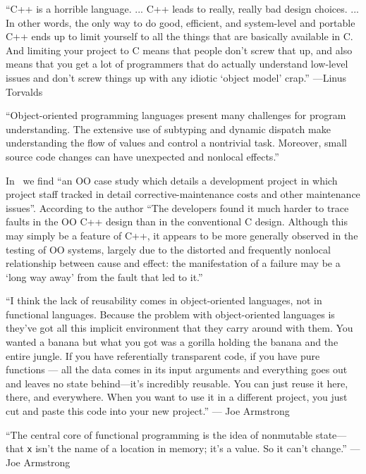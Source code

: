 \documentclass{article}
\begin{document}
\enquote{C++ is a horrible language. ... C++ leads to really, really bad
design choices. ... In other words, the only way to do good, efficient, and
system-level and portable C++ ends up to limit yourself to all the things
that are basically available in C. And limiting your project to C means that
people don't screw that up, and also means that you get a lot of programmers
that do actually understand low-level issues and don't screw things up with
any idiotic \enquote{object model} crap.}
---Linus Torvalds\cite{Tor}

\enquote{Object-oriented programming languages present many challenges for
program understanding. The extensive use of subtyping and dynamic dispatch
make understanding the flow of values and control a nontrivial task.
Moreover, small source code changes can have unexpected and nonlocal
effects.}\cite{RT01}

In~\cite{Hat98} we find \enquote{an OO case study which details a development project in which project staff tracked in detail corrective-maintenance costs and other maintenance issues}.
According to the author
\enquote{The developers found it much harder to trace faults in the OO C++
design than in the conventional C design. Although this may simply be a
feature of C++, it appears to be more generally observed in the testing of OO
systems, largely due to the distorted and frequently nonlocal relationship
between cause and effect: the manifestation of a failure may be a
\enquote{long way away} from the fault that led to it.}\cite{Hat98}

\enquote{I think the lack of reusability comes in object-oriented languages,
not in functional languages. Because the problem with object-oriented
languages is they've got all this implicit environment that they carry around
with them. You wanted a banana but what you got was a gorilla holding the
banana and the entire jungle. If you have referentially transparent code, if
you have pure functions --- all the data comes in its input arguments and
everything goes out and leaves no state behind---it's incredibly reusable.
You can just reuse it here, there, and everywhere. When you want to use it in
a different project, you just cut and paste this code into your new project.}
--- Joe Armstrong\cite{Sei09}

\enquote{The central core of functional programming is the idea of nonmutable
state---that \texttt{x} isn't the name of a location in memory; it's a value.
So it can't change.}
--- Joe Armstrong\cite{Sei09}
\end{document}
